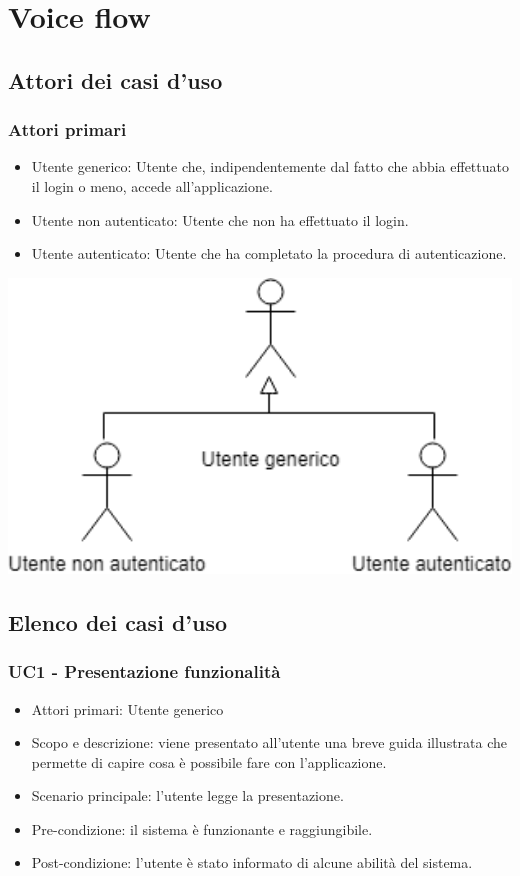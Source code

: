 \clearpage
\section{Voice flow}
\label{sec:voice_flow}
\subsection{Attori dei casi d'uso}
\label{sec:attori_uc}
\subsubsection{Attori primari}
\begin{itemize}
	\item  Utente generico: Utente che, indipendentemente dal fatto che abbia effettuato il login o meno, accede all'applicazione.
	\item  Utente non autenticato: Utente che non ha effettuato il login.
	\item  Utente autenticato: Utente che ha completato la procedura di autenticazione.
\end{itemize}
\includegraphics[width=1\textwidth]{../includes/pics/primari.png}
\subsection{Elenco dei casi d'uso}
\label{sec:elenco_uc}
\subsubsection{UC1 - Presentazione funzionalità}
\begin{itemize}
	\item  Attori primari:  Utente generico
	\item  Scopo e descrizione: viene presentato all'utente una breve guida illustrata che permette di capire cosa è possibile fare con l'applicazione.
	\item  Scenario principale: l'utente legge la presentazione.
	\item  Pre-condizione: il sistema è funzionante e raggiungibile.
	\item  Post-condizione: l'utente è stato informato di alcune abilità del sistema.
\end{itemize}
